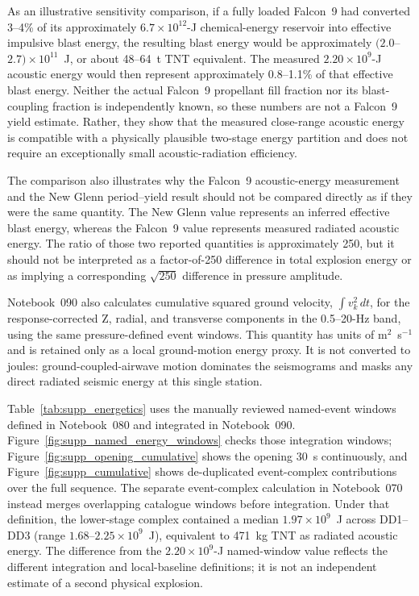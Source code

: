 \documentclass[]{seismica}
\begin{document}
As an illustrative sensitivity comparison, if a fully loaded Falcon~9 had
converted 3--4\% of its approximately $6.7\times10^{12}$-J chemical-energy
reservoir into effective impulsive blast energy, the resulting blast energy
would be approximately $(2.0$--$2.7)\times10^{11}$~J, or about 48--64~t TNT
equivalent. The measured $2.20\times10^9$-J acoustic energy would then
represent approximately 0.8--1.1\% of that effective blast energy. Neither the
actual Falcon~9 propellant fill fraction nor its blast-coupling fraction is
independently known, so these numbers are not a Falcon~9 yield estimate.
Rather, they show that the measured close-range acoustic energy is compatible
with a physically plausible two-stage energy partition and does not require an
exceptionally small acoustic-radiation efficiency.

The comparison also illustrates why the Falcon~9 acoustic-energy measurement
and the New Glenn period--yield result should not be compared directly as if
they were the same quantity. The New Glenn value represents an inferred
effective blast energy, whereas the Falcon~9 value represents measured
radiated acoustic energy. The ratio of those two reported quantities is
approximately 250, but it should not be interpreted as a factor-of-250
difference in total explosion energy or as implying a corresponding
$\sqrt{250}$ difference in pressure amplitude.

Notebook~090 also calculates cumulative squared ground velocity,
$\int v_k^2\,dt$, for the response-corrected Z, radial, and transverse
components in the 0.5--20-Hz band, using the same pressure-defined event
windows. This quantity has units of m$^2$~s$^{-1}$ and is retained only as a
local ground-motion energy proxy. It is not converted to joules:
ground-coupled-airwave motion dominates the seismograms and masks any direct
radiated seismic energy at this single station.

Table~\ref{tab:supp_energetics} uses the manually reviewed named-event windows
defined in Notebook~080 and integrated in Notebook~090.
Figure~\ref{fig:supp_named_energy_windows} checks those integration windows;
Figure~\ref{fig:supp_opening_cumulative} shows the opening 30~s continuously,
and Figure~\ref{fig:supp_cumulative} shows de-duplicated event-complex
contributions over the full sequence. The separate event-complex calculation
in Notebook~070 instead merges overlapping catalogue windows before
integration. Under that definition, the lower-stage complex contained a median
$1.97\times10^9$~J across DD1--DD3 (range
$1.68$--$2.25\times10^9$~J), equivalent to 471~kg TNT as radiated acoustic
energy. The difference from the $2.20\times10^9$-J named-window value reflects
the different integration and local-baseline definitions; it is not an
independent estimate of a second physical explosion.
\end{document}
